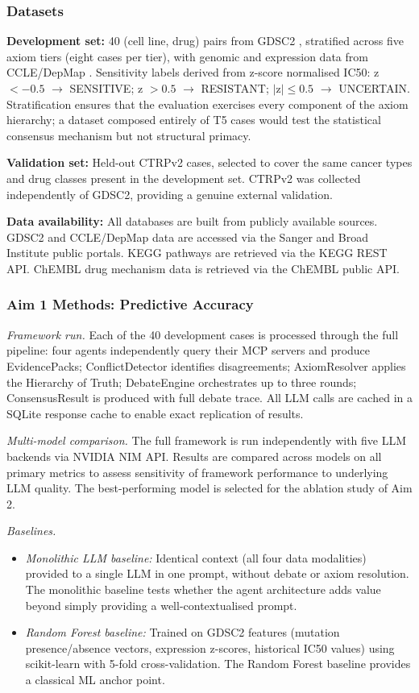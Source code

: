 \documentclass[11pt,letterpaper]{article}
\begin{document}
\subsubsection{Datasets}

\textbf{Development set:} 40 (cell line, drug) pairs from GDSC2 \cite{ref20}, stratified across
five axiom tiers (eight cases per tier), with genomic and expression data from CCLE/DepMap
\cite{ref19}. Sensitivity labels derived from z-score normalised IC50: z $< -0.5$ $\to$
SENSITIVE; z $> 0.5$ $\to$ RESISTANT; $|$z$| \leq 0.5$ $\to$ UNCERTAIN. Stratification ensures
that the evaluation exercises every component of the axiom hierarchy; a dataset composed
entirely of T5 cases would test the statistical consensus mechanism but not structural primacy.

\textbf{Validation set:} Held-out CTRPv2 cases, selected to cover the same cancer types and
drug classes present in the development set. CTRPv2 was collected independently of GDSC2,
providing a genuine external validation.

\textbf{Data availability:} All databases are built from publicly available sources. GDSC2 and
CCLE/DepMap data are accessed via the Sanger and Broad Institute public portals. KEGG
pathways are retrieved via the KEGG REST API. ChEMBL drug mechanism data is retrieved via
the ChEMBL public API.

\subsubsection{Aim 1 Methods: Predictive Accuracy}

\textit{Framework run.} Each of the 40 development cases is processed through the full pipeline:
four agents independently query their MCP servers and produce EvidencePacks; ConflictDetector
identifies disagreements; AxiomResolver applies the Hierarchy of Truth; DebateEngine
orchestrates up to three rounds; ConsensusResult is produced with full debate trace. All LLM
calls are cached in a SQLite response cache to enable exact replication of results.

\textit{Multi-model comparison.} The full framework is run independently with five LLM
backends via NVIDIA NIM API. Results are compared across models on all primary metrics to
assess sensitivity of framework performance to underlying LLM quality. The best-performing
model is selected for the ablation study of Aim 2.

\textit{Baselines.}
\begin{itemize}
\item \textit{Monolithic LLM baseline:} Identical context (all four data modalities) provided to
a single LLM in one prompt, without debate or axiom resolution. The monolithic baseline tests
whether the agent architecture adds value beyond simply providing a well-contextualised prompt.
\item \textit{Random Forest baseline:} Trained on GDSC2 features (mutation presence/absence
vectors, expression z-scores, historical IC50 values) using scikit-learn with 5-fold cross-validation.
The Random Forest baseline provides a classical ML anchor point.
\end{itemize}
\end{document}
